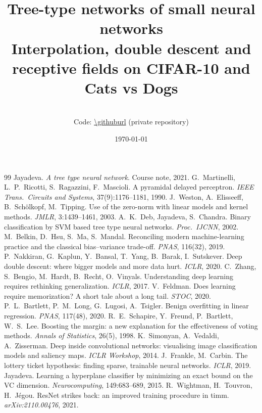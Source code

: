 \documentclass[11pt,a4paper]{article}
\title{\textbf{Tree-type networks of small neural networks}\\[2pt]
\large Interpolation, double descent and receptive fields on CIFAR-10 and Cats vs Dogs}
\author{\authorname\\[2pt]\small Code: \url{\githuburl} \;(private repository)}
\date{\today}
\begin{document}
\maketitle














\begin{thebibliography}{99}\small
{} Jayadeva. \emph{A tree type neural network}. Course note, 2021.
 G.~Martinelli, L.~P.~Ricotti, S.~Ragazzini, F.~Mascioli. A pyramidal delayed perceptron. \emph{IEEE Trans.\ Circuits and Systems}, 37(9):1176--1181, 1990.
 J.~Weston, A.~Elisseeff, B.~Sch\"olkopf, M.~Tipping. Use of the zero-norm with linear models and kernel methods. \emph{JMLR}, 3:1439--1461, 2003.
 A.~K.~Deb, Jayadeva, S.~Chandra. Binary classification by SVM based tree type neural networks. \emph{Proc.\ IJCNN}, 2002.
 M.~Belkin, D.~Hsu, S.~Ma, S.~Mandal. Reconciling modern machine-learning practice and the classical bias--variance trade-off. \emph{PNAS}, 116(32), 2019.
 P.~Nakkiran, G.~Kaplun, Y.~Bansal, T.~Yang, B.~Barak, I.~Sutskever. Deep double descent: where bigger models and more data hurt. \emph{ICLR}, 2020.
 C.~Zhang, S.~Bengio, M.~Hardt, B.~Recht, O.~Vinyals. Understanding deep learning requires rethinking generalization. \emph{ICLR}, 2017.
 V.~Feldman. Does learning require memorization? A short tale about a long tail. \emph{STOC}, 2020.
 P.~L.~Bartlett, P.~M.~Long, G.~Lugosi, A.~Tsigler. Benign overfitting in linear regression. \emph{PNAS}, 117(48), 2020.
 R.~E.~Schapire, Y.~Freund, P.~Bartlett, W.~S.~Lee. Boosting the margin: a new explanation for the effectiveness of voting methods. \emph{Annals of Statistics}, 26(5), 1998.
 K.~Simonyan, A.~Vedaldi, A.~Zisserman. Deep inside convolutional networks: visualising image classification models and saliency maps. \emph{ICLR Workshop}, 2014.
 J.~Frankle, M.~Carbin. The lottery ticket hypothesis: finding sparse, trainable neural networks. \emph{ICLR}, 2019.
 Jayadeva. Learning a hyperplane classifier by minimizing an exact bound on the VC dimension. \emph{Neurocomputing}, 149:683--689, 2015.
 R.~Wightman, H.~Touvron, H.~J\'egou. ResNet strikes back: an improved training procedure in timm. \emph{arXiv:2110.00476}, 2021.
\end{thebibliography}

\appendix

\end{document}
